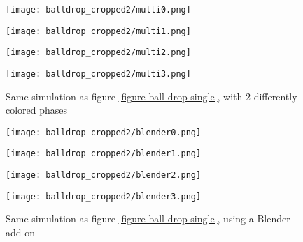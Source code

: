 \begin{figure}[H]
    \centering
    
    \begin{minipage}[t]{6.2cm}
        \centering
        \vspace{0pt}
        \texttt{[image: balldrop\_cropped2/multi0.png]}
    \end{minipage}
    \begin{minipage}[t]{6.2cm}
        \centering
        \vspace{0pt}
        \texttt{[image: balldrop\_cropped2/multi1.png]}
    \end{minipage}

    \vspace{0.5cm}

    \begin{minipage}[t]{6.2cm}
        \centering
        \vspace{0pt}
        \texttt{[image: balldrop\_cropped2/multi2.png]}
    \end{minipage}
    \begin{minipage}[t]{6.2cm}
        \centering
        \vspace{0pt}
        \texttt{[image: balldrop\_cropped2/multi3.png]}
    \end{minipage}

    \caption{Same simulation as figure \ref{figure ball drop single}, with 2 differently colored phases}
    \label{figure ball drop multi}
\end{figure}



\begin{figure}[H]
    \centering
    
    \begin{minipage}[t]{6.2cm}
        \centering
        \vspace{0pt}
        \texttt{[image: balldrop\_cropped2/blender0.png]}
    \end{minipage}
    \begin{minipage}[t]{6.2cm}
        \centering
        \vspace{0pt}
        \texttt{[image: balldrop\_cropped2/blender1.png]}
    \end{minipage}

    \vspace{0.5cm}

    \begin{minipage}[t]{6.2cm}
        \centering
        \vspace{0pt}
        \texttt{[image: balldrop\_cropped2/blender2.png]}
    \end{minipage}
    \begin{minipage}[t]{6.2cm}
        \centering
        \vspace{0pt}
        \texttt{[image: balldrop\_cropped2/blender3.png]}
    \end{minipage}

    \caption{Same simulation as figure \ref{figure ball drop single}, using a Blender add-on}
    \label{figure ball drop blender}
\end{figure}


